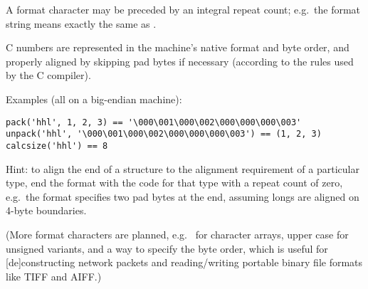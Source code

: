 A format character may be preceded by an integral repeat count; e.g.\
the format string  means exactly the same as .

C numbers are represented in the machine's native format and byte
order, and properly aligned by skipping pad bytes if necessary
(according to the rules used by the C compiler).

Examples (all on a big-endian machine):

\bcode\begin{verbatim}
pack('hhl', 1, 2, 3) == '\000\001\000\002\000\000\000\003'
unpack('hhl', '\000\001\000\002\000\000\000\003') == (1, 2, 3)
calcsize('hhl') == 8
\end{verbatim}\ecode

Hint: to align the end of a structure to the alignment requirement of
a particular type, end the format with the code for that type with a
repeat count of zero, e.g.\ the format \code{'llh0l'} specifies two
pad bytes at the end, assuming longs are aligned on 4-byte boundaries.

(More format characters are planned, e.g.\  for character
arrays, upper case for unsigned variants, and a way to specify the
byte order, which is useful for [de]constructing network packets and
reading/writing portable binary file formats like TIFF and AIFF.)
